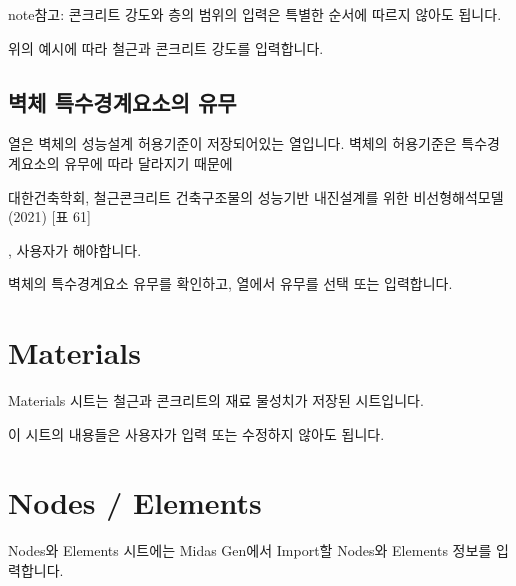 \documentclass[a4paper,11pt,korean,openany,oneside]{sphinxmanual}
\begin{document}
\begin{sphinxadmonition}{note}{참고:}
\sphinxAtStartPar
콘크리트 강도와 층의 범위의 입력은 특별한 순서에 따르지 않아도 됩니다.
\end{sphinxadmonition}

\begin{sphinxShadowBox}

\sphinxAtStartPar
위의 예시에 따라 철근과 콘크리트 강도를 입력합니다.
\end{sphinxShadowBox}


\subsection{벽체 특수경계요소의 유무}
\label{\detokenize{2_etc:id3}}
\sphinxAtStartPar
{}열은 벽체의 성능설계 허용기준이 저장되어있는 열입니다.
벽체의 허용기준은 특수경계요소의 유무에 따라 달라지기 때문에%
\begin{footnote}[1]\sphinxAtStartFootnote
대한건축학회, 철근콘크리트 건축구조물의 성능기반 내진설계를 위한 비선형해석모델(2021) {[}표 6\sphinxhyphen{}1{]}
%
\end{footnote}, 사용자가 해야합니다.

\begin{sphinxShadowBox}

\sphinxAtStartPar
벽체의 특수경계요소 유무를 확인하고, 열에서 유무를 선택 또는 입력합니다.
\end{sphinxShadowBox}

\sphinxstepscope


\section{Materials}
\label{\detokenize{2_materials:materials}}\label{\detokenize{2_materials::doc}}
\sphinxAtStartPar
Materials 시트는 철근과 콘크리트의 재료 물성치가 저장된 시트입니다.

\sphinxAtStartPar
이 시트의 내용들은 사용자가 입력 또는 수정하지 않아도 됩니다.

\sphinxstepscope


\section{Nodes / Elements}
\label{\detokenize{2_nodes_elements:nodes-elements}}\label{\detokenize{2_nodes_elements::doc}}
\sphinxAtStartPar
Nodes와 Elements 시트에는 Midas Gen에서 Import할 Nodes와 Elements 정보를 입력합니다.
\end{document}
